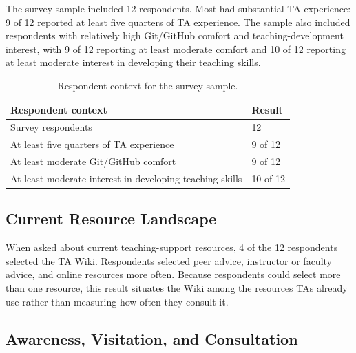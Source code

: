 \documentclass[11pt]{article}
\newcommand{\td}[1]{\item \textcolor{red!70!black}{TODO: #1}}
\begin{document}
The survey sample included 12 respondents. Most had substantial TA experience: 9 of 12 reported at least five quarters of TA experience. The sample also included respondents with relatively high Git/GitHub comfort and teaching-development interest, with 9 of 12 reporting at least moderate comfort and 10 of 12 reporting at least moderate interest in developing their teaching skills.

\begin{table}[htbp]
\centering
\caption{Respondent context for the survey sample.}
\label{tab:respondent-context}
\begin{tabular}{@{}p{}p{}@{}}
\toprule
Respondent context & Result \\
\midrule
Survey respondents & 12 \\
At least five quarters of TA experience & 9 of 12 \\
At least moderate Git/GitHub comfort & 9 of 12 \\
At least moderate interest in developing teaching skills & 10 of 12 \\
\bottomrule
\end{tabular}
\end{table}

\subsection{Current Resource Landscape}

When asked about current teaching-support resources, 4 of the 12 respondents selected the TA Wiki. Respondents selected peer advice, instructor or faculty advice, and online resources more often. Because respondents could select more than one resource, this result situates the Wiki among the resources TAs already use rather than measuring how often they consult it. 

\subsection{Awareness, Visitation, and Consultation}
\end{document}
